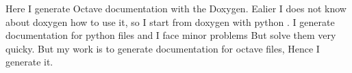 Here I generate Octave documentation with the Doxygen. Ealier I does not know about doxygen how to use it, so I start from doxygen with python . I generate documentation for python files and I face minor problems But solve them very quicky. But my work is to generate documentation for octave files, Hence I generate it. 